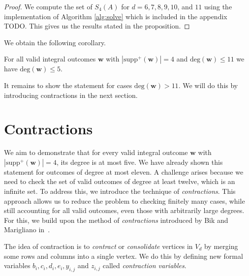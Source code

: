\begin{proof}
    We compute the set of \( S_4(A) \) for \( d = 6,7,8,9,10 \), and \( 11 \) using the implementation of Algorithm \ref{alg:solve} which is included in the appendix TODO. This gives us the results stated in the proposition. 
\end{proof}

We obtain the following corollary.

\begin{corollary}
    For all valid integral outcomes \( \mathbf w \) with \( |\mathrm{supp}^+(\mathbf w)| = 4 \) and \( \mathrm{deg}(\mathbf{w}) \leq 11 \) we have \( \mathrm{deg}(\mathbf w) \leq 5 \).
\end{corollary}

It remains to show the statement for cases \( \mathrm{deg}(\mathbf{w}) > 11 \). We will do this by introducing contractions in the next section.

\section{Contractions}

We aim to demonstrate that for every valid integral outcome \( \mathbf{w} \) with 
\( |\mathrm{supp}^+(\mathbf{w})| = 4 \), its degree is at most five. We have already shown this statement for outcomes of degree at most eleven. A challenge arises because we need to check the set of valid outcomes of degree at least twelve, which is an infinite set. To address this, we introduce the technique of \emph{contractions}. This approach allows us to reduce the problem to checking finitely many cases, while still accounting for all valid outcomes, even those with arbitrarily large degrees. For this, we build upon the method of \emph{contractions} introduced by Bik and Marigliano in~\cite{bik2022classifying}.

The idea of contraction is to \emph{contract} or \emph{consolidate} vertices in \( V_d \) by merging some rows and columns into a single vertex. We do this by defining new formal variables \( b_{i}, c_{i}, d_{i}, e_{i}, y_{i,j} \) and \( z_{i,j} \) called \emph{contraction variables}. 

